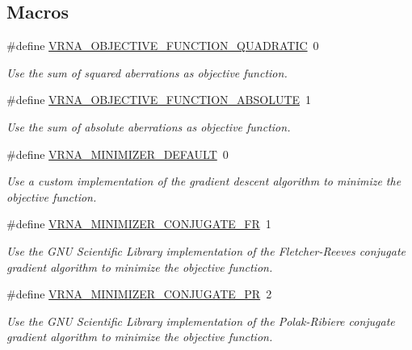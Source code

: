 \subsection*{Macros}
\begin{DoxyCompactItemize}
\item 
\#define \mbox{\hyperlink{group__perturbation_ga81e10993d1ae728e4e02022b33155a12}{V\+R\+N\+A\+\_\+\+O\+B\+J\+E\+C\+T\+I\+V\+E\+\_\+\+F\+U\+N\+C\+T\+I\+O\+N\+\_\+\+Q\+U\+A\+D\+R\+A\+T\+IC}}~0
\begin{DoxyCompactList}\small\item\em Use the sum of squared aberrations as objective function. \end{DoxyCompactList}\item 
\#define \mbox{\hyperlink{group__perturbation_gac070dfb9cafaeb14d5652bd9adf0f6b1}{V\+R\+N\+A\+\_\+\+O\+B\+J\+E\+C\+T\+I\+V\+E\+\_\+\+F\+U\+N\+C\+T\+I\+O\+N\+\_\+\+A\+B\+S\+O\+L\+U\+TE}}~1
\begin{DoxyCompactList}\small\item\em Use the sum of absolute aberrations as objective function. \end{DoxyCompactList}\item 
\mbox{\label{group__perturbation_gae5126200d80dbb282f46083fffc606bf}} 
\#define \mbox{\hyperlink{group__perturbation_gae5126200d80dbb282f46083fffc606bf}{V\+R\+N\+A\+\_\+\+M\+I\+N\+I\+M\+I\+Z\+E\+R\+\_\+\+D\+E\+F\+A\+U\+LT}}~0
\begin{DoxyCompactList}\small\item\em Use a custom implementation of the gradient descent algorithm to minimize the objective function. \end{DoxyCompactList}\item 
\#define \mbox{\hyperlink{group__perturbation_gab1d89db58e8c497795a5005f5dbc8c4a}{V\+R\+N\+A\+\_\+\+M\+I\+N\+I\+M\+I\+Z\+E\+R\+\_\+\+C\+O\+N\+J\+U\+G\+A\+T\+E\+\_\+\+FR}}~1
\begin{DoxyCompactList}\small\item\em Use the G\+NU Scientific Library implementation of the Fletcher-\/\+Reeves conjugate gradient algorithm to minimize the objective function. \end{DoxyCompactList}\item 
\#define \mbox{\hyperlink{group__perturbation_ga5aaeafe1b0aa77a5cda18943ff94b02f}{V\+R\+N\+A\+\_\+\+M\+I\+N\+I\+M\+I\+Z\+E\+R\+\_\+\+C\+O\+N\+J\+U\+G\+A\+T\+E\+\_\+\+PR}}~2
\begin{DoxyCompactList}\small\item\em Use the G\+NU Scientific Library implementation of the Polak-\/\+Ribiere conjugate gradient algorithm to minimize the objective function. \end{DoxyCompactList}\item 

\end{DoxyCompactItemize}
